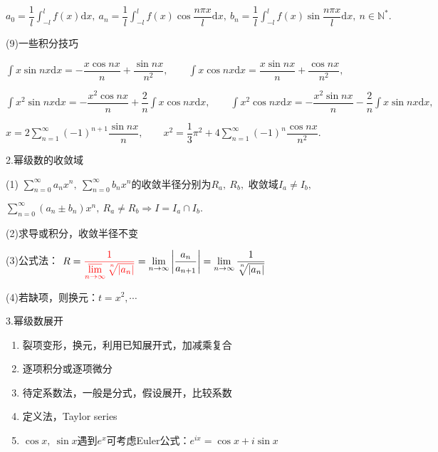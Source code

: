 \documentclass[UTF8]{ctexart}
\numberwithin{equation}{section}
\numberwithin{figure}{section}
\numberwithin{table}{section}
\newcommand\dif{\mathrm{d}}
\newcommand\no{\noindent}
\newcommand\dis{\displaystyle}
\newcommand\limn{\dis\lim\limits_{n\to\infty}}
\newcommand\sumn{\dis\sum\limits_{n=1}^{\infty}}
\newcommand\sumnz{\dis\sum\limits_{n=0}^{\infty}}
\newcommand\intd{\dis\int}
\begin{document}
\begin{spacing}{2}
$ a_0=\dfrac{1}{l}\intd_{-l}^lf(x)\dif x,\ a_n=\dfrac{1}{l}\intd_{-l}^lf(x)\cos\dfrac{n\pi x}{l}\dif x,\ b_n=\dfrac{1}{l}\intd_{-l}^lf(x)\sin\dfrac{n\pi x}{l}\dif x,\ n\in\mathbb{N}^*.$

\no(9)一些积分技巧

$\intd x\sin nx\dif x=-\dfrac{x\cos nx}{n}+\dfrac{\sin nx}{n^2},
\qquad
\intd x\cos nx\dif x=\dfrac{x\sin nx}{n}+\dfrac{\cos nx}{n^2},$

\vspace{0.2cm}

$\intd x^2\sin nx\dif x=-\dfrac{x^2\cos nx}{n}+\dfrac{2}{n}\intd x\cos nx\dif x,
\qquad
\intd x^2\cos nx\dif x=-\dfrac{x^2\sin nx}{n}-\dfrac{2}{n}\intd x\sin nx\dif x,$

\vspace{0.2cm}

$x=2\sumn(-1)^{n+1}\dfrac{\sin nx}{n},
\qquad
x^2=\dfrac{1}{3}\pi^2+4\sumn(-1)^n\dfrac{\cos nx}{n^2}.$

\no2.幂级数的收敛域

(1) $\sumnz a_nx^n,\ \sumnz b_nx^n$的收敛半径分别为$R_a,\ R_b,$ 收敛域$I_a\neq I_b,$

\centerline{$\sumnz (a_n\pm b_n)x^n,\ R_a\neq R_b\Longrightarrow I=I_a\cap I_b.$}

\vspace{0.2cm}

(2)求导或积分，收敛半径不变

(3)公式法：
$R=\textcolor[rgb]{1,0,0}{\dis\dfrac{1}{\varlimsup\limits_{n\to\infty}\sqrt[^n\!]{|a_n|}}}
=\limn\left|\dfrac{a_n}{a_{n+1}}\right|
=\limn\dfrac{1}{\sqrt[^n\!]{|a_n|}}$

\vspace{0.2cm}

(4)若缺项，则换元：$t=x^2,\cdots$

\no3.幂级数展开

\begin{enumerate}[itemindent=1.4em, label=(\arabic*)]

\item 裂项变形，换元，利用已知展开式，加减乘复合

\item 逐项积分或逐项微分

\item 待定系数法，一般是分式，假设展开，比较系数

\item 定义法，Taylor series

\item $\cos x,\ \sin x$遇到$e^x$可考虑Euler公式：$e^{ix}=\cos x+i\sin x$


\end{enumerate}
\end{spacing}
\end{document}
